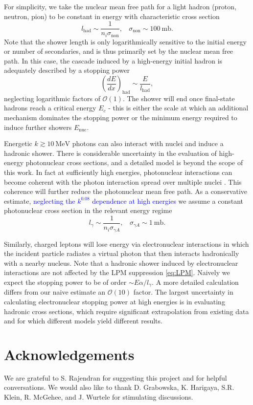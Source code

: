 \documentclass[twocolumn,showpacs,preprintnumbers,amsmath,amssymb,prd]{revtex4}
\newcommand{\OO}{\mathcal{O}}
\def\r{\right)}
\def\l{\left(}
\begin{document}
\begin{appendices}
For simplicity, we take the nuclear mean free path for a light hadron (proton, neutron, pion) to be constant in energy with characteristic cross section
\begin{equation}
l_\text{had} \sim  \frac{1}{n_i \sigma_\text{non}}, ~~~~ \sigma_\text{non} \sim 100 ~\text{mb}.
\end{equation}
Note that the shower length is only logarithmically sensitive to the initial energy or number of secondaries, and is thus primarily set by the nuclear mean free path. In this case, the cascade induced by a high-energy initial hadron is adequately described by a stopping power
\begin{equation}
\label{eq:nucshower}
\l \frac{dE}{dx}\r_\text{had} \sim \frac{E}{l_\text{had}},
\end{equation}
neglecting logarithmic factors of $\OO(1)$. The shower will end once final-state hadrons reach a critical energy $E_c$ - this is either the scale at which an additional mechanism dominates the stopping power or the minimum energy required to induce further showers $E_\text{nuc}$.

Energetic $k \gtrsim 10 ~\text{MeV}$ photons can also interact with nuclei and induce a hadronic shower. There is considerable uncertainty in the evaluation of high-energy photonuclear cross sections, and a detailed model is beyond the scope of this work. In fact at sufficiently high energies, photonuclear interactions can become coherent with the photon interaction spread over multiple nuclei \cite{Gerhardt:2010bj}. This coherence will further reduce the photonuclear mean free path. As a conservative estimate, \textcolor{blue}{neglecting the $k^{0.08}$ dependence at high energies} we assume a constant photonuclear cross section in the relevant energy regime
\begin{equation}
l_\gamma \sim \frac{1}{n_i \sigma_{\gamma A}}, ~~~~ \sigma_{\gamma A} \sim 1 ~\text{mb}.
\end{equation}

Similarly, charged leptons will lose energy via electronuclear interactions in which the incident particle radiates a virtual photon that then interacts hadronically with a nearby nucleus. Note that a hadronic shower induced by electronuclear interactions are not affected by the LPM suppression \eqref{eq:LPM}. Naively we expect the stopping power to be of order $\sim E \alpha/l_\gamma$. A more detailed calculation \cite{Gerhardt:2010bj} differs from our naive estimate an $\OO(10)$ factor. The largest uncertainty in calculating electronuclear stopping power at high energies is in evaluating hadronic cross sections, which require significant extrapolation from existing data and for which different models yield different results.

\end{appendices}

\section*{Acknowledgements}
We are grateful to S. Rajendran for suggesting this project and for helpful conversations. We would also like to thank D. Grabowska, K. Harigaya, S.R. Klein, R. McGehee, and J. Wurtele for stimulating discussions.


\end{document}
